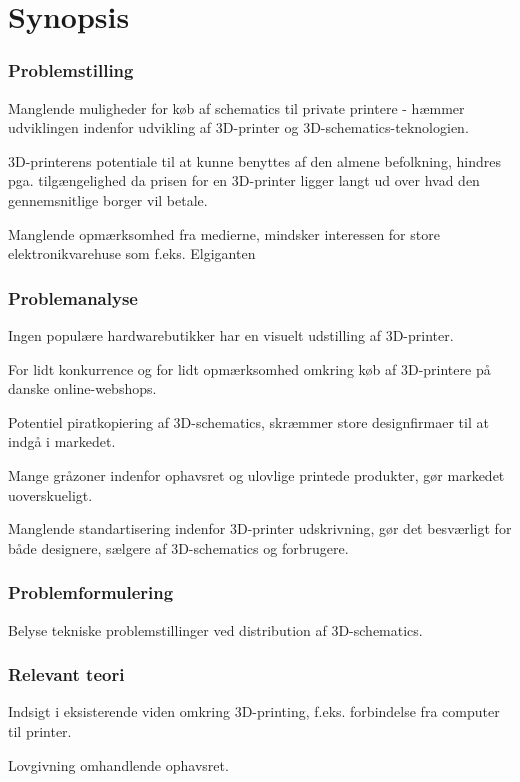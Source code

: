 \chapter{Synopsis} %
\label{cha:synopsis}


\subsection{Problemstilling} %
\label{sub:problemstilling}

Manglende muligheder for køb af schematics til private printere - hæmmer udviklingen indenfor udvikling af 3D-printer og 3D-schematics-teknologien.

3D-printerens potentiale til at kunne benyttes af den almene befolkning, hindres pga. tilgængelighed da prisen for en 3D-printer ligger langt ud over hvad den gennemsnitlige borger vil betale.

Manglende opmærksomhed fra medierne, mindsker interessen for store elektronikvarehuse som f.eks. Elgiganten



\subsection{Problemanalyse} %
\label{sub:problemanalyse}

Ingen populære hardwarebutikker har en visuelt udstilling af 3D-printer.

For lidt konkurrence og for lidt opmærksomhed omkring køb af 3D-printere på danske online-webshops.

Potentiel piratkopiering af 3D-schematics, skræmmer store designfirmaer til at indgå i markedet.

Mange gråzoner indenfor ophavsret og ulovlige printede produkter, gør markedet uoverskueligt.

Manglende standartisering indenfor 3D-printer udskrivning, gør det besværligt for både designere, sælgere af 3D-schematics og forbrugere.



\subsection{Problemformulering} %
\label{sub:problemformulering}

Belyse tekniske problemstillinger ved distribution af 3D-schematics.





\subsection{Relevant teori} %
\label{sub:relevant_teori}

Indsigt i eksisterende viden omkring 3D-printing, f.eks. forbindelse fra computer til printer.

Lovgivning omhandlende ophavsret.

